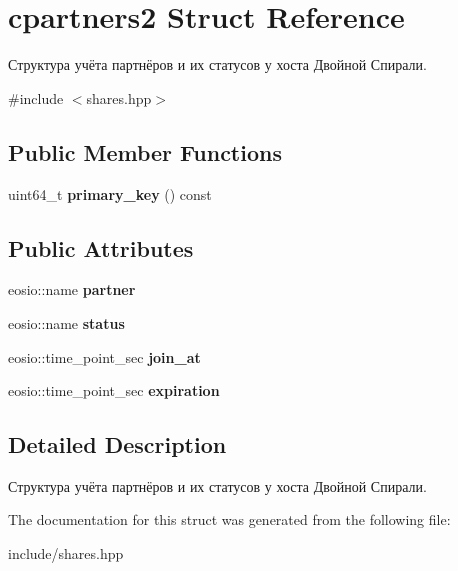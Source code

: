 \hypertarget{structcpartners2}{}\section{cpartners2 Struct Reference}
\label{structcpartners2}


Структура учёта партнёров и их статусов у хоста Двойной Спирали.  




{\ttfamily \#include $<$shares.\+hpp$>$}

\subsection*{Public Member Functions}
\begin{DoxyCompactItemize}
\item 
\mbox{\label{structcpartners2_a492e088c954ac116e444dea32687f537}} 
uint64\+\_\+t {\bfseries primary\+\_\+key} () const
\end{DoxyCompactItemize}
\subsection*{Public Attributes}
\begin{DoxyCompactItemize}
\item 
\mbox{\label{structcpartners2_aaf8d230c6041cc9558ab5a8aaf5fcc19}} 
eosio\+::name {\bfseries partner}
\item 
\mbox{\label{structcpartners2_a6d964e260d55c19e8083af67aa853562}} 
eosio\+::name {\bfseries status}
\item 
\mbox{\label{structcpartners2_a7d5331f9cc298535c4114faa7cdb90d5}} 
eosio\+::time\+\_\+point\+\_\+sec {\bfseries join\+\_\+at}
\item 
\mbox{\label{structcpartners2_a96eb13b5f403f2268a7abc3bfa4f81d3}} 
eosio\+::time\+\_\+point\+\_\+sec {\bfseries expiration}
\end{DoxyCompactItemize}


\subsection{Detailed Description}
Структура учёта партнёров и их статусов у хоста Двойной Спирали. 

The documentation for this struct was generated from the following file\+:\begin{DoxyCompactItemize}
\item 
include/shares.\+hpp\end{DoxyCompactItemize}
